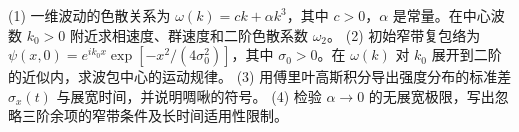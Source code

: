 (1) 一维波动的色散关系为 \(\omega(k)=ck+\alpha k^3\)，其中 \(c>0\)，\(\alpha\) 是常量。在中心波数 \(k_0>0\) 附近求相速度、群速度和二阶色散系数 \(\omega_2\)。
(2) 初始窄带复包络为 \(\psi(x,0)=e^{ik_0x}\exp[-x^2/(4\sigma_0^2)]\)，其中 \(\sigma_0>0\)。在 \(\omega(k)\) 对 \(k_0\) 展开到二阶的近似内，求波包中心的运动规律。
(3) 用傅里叶高斯积分导出强度分布的标准差 \(\sigma_x(t)\) 与展宽时间，并说明啁啾的符号。
(4) 检验 \(\alpha\to0\) 的无展宽极限，写出忽略三阶余项的窄带条件及长时间适用性限制。
